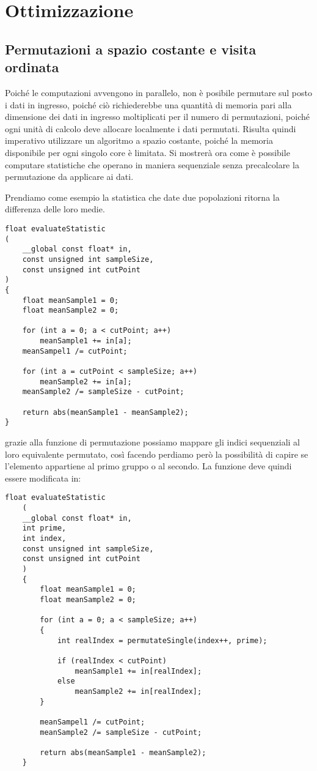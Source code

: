\section{Ottimizzazione}

\subsection{Permutazioni a spazio costante e visita ordinata}
Poiché le computazioni avvengono in parallelo, non è posibile permutare sul posto i dati in ingresso, poiché ciò richiederebbe una quantità di memoria pari alla dimensione dei dati in ingresso moltiplicati per il numero di permutazioni, poiché ogni unità di calcolo deve allocare localmente i dati permutati. Risulta quindi imperativo utilizzare un algoritmo a spazio costante, poiché la memoria disponibile per ogni singolo core è limitata.
Si mostrerà ora come è possibile computare statistiche che operano in maniera sequenziale senza precalcolare la permutazione da applicare ai dati.

Prendiamo come esempio la statistica che date due popolazioni ritorna la differenza delle loro medie.

\begin{lstlisting}[style=CStyle]
float evaluateStatistic
(
	__global const float* in, 
	const unsigned int sampleSize, 
	const unsigned int cutPoint
)
{
	float meanSample1 = 0;
	float meanSample2 = 0;
	
	for (int a = 0; a < cutPoint; a++)
		meanSample1 += in[a];
	meanSampel1 /= cutPoint;
		
	for (int a = cutPoint < sampleSize; a++)
		meanSample2 += in[a];
	meanSample2 /= sampleSize - cutPoint;	
	
	return abs(meanSample1 - meanSample2);
}
\end{lstlisting}

grazie alla funzione di permutazione possiamo mappare gli indici sequenziali al loro equivalente permutato, così facendo perdiamo però la possibilità di capire se l'elemento appartiene al primo gruppo o al secondo.
La funzione deve quindi essere modificata in:

\begin{lstlisting}[style=CStyle]
	float evaluateStatistic
	(
	__global const float* in,
	int prime,
	int index,
	const unsigned int sampleSize, 
	const unsigned int cutPoint
	)
	{
		float meanSample1 = 0;
		float meanSample2 = 0;
		
		for (int a = 0; a < sampleSize; a++)
		{
			int realIndex = permutateSingle(index++, prime);
			
			if (realIndex < cutPoint)
				meanSample1 += in[realIndex];
			else
				meanSample2 += in[realIndex];
		}
		
		meanSampel1 /= cutPoint;
		meanSample2 /= sampleSize - cutPoint;	
		
		return abs(meanSample1 - meanSample2);
	}
\end{lstlisting}



